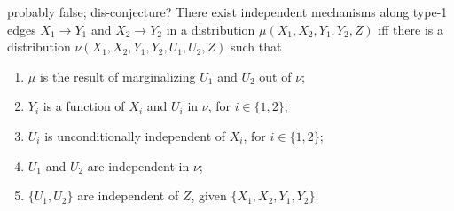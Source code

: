 \documentclass{article}
\begin{document}
    
    
    
    \begin{conj}
        {\color{red} probably false; dis-conjecture?}
        There exist independent mechanisms along type-1 edges  $X_1 \to Y_1$ and $X_2 \to Y_2$ in a distribution $\mu(X_1, X_2, Y_1, Y_2, Z)$ 
        iff there is a distribution
        $\nu(X_1, X_2, Y_1, Y_2, U_1, U_2, Z)$ such that
        \begin{enumerate}[itemsep=0pt, label=(\alph*)]
        \item $\mu$ is the result of marginalizing $U_1$ and $U_2$ out of $\nu$;
        \item $Y_i$ is a function of $X_i$ and $U_i$ in $\nu$, for $i \in \{1,2\}$;
        \item $U_i$ is unconditionally independent of $X_i$, for $i \in \{1,2\}$;
        \item $U_1$ and $U_2$ are independent in $\nu$;
        \item $\{U_1, U_2\}$ are independent of $Z$, given $\{X_1, X_2, Y_1, Y_2\}$.
        \end{enumerate}
         
    \end{conj}
    
    
\end{document}
